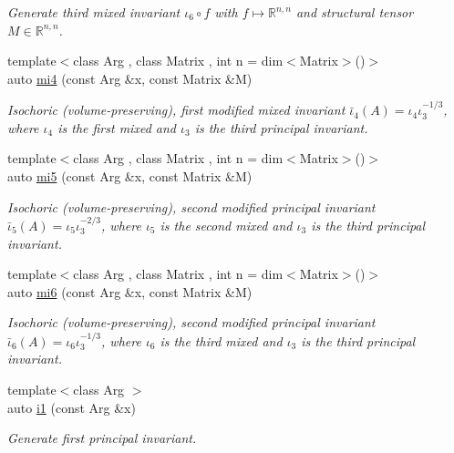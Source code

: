 \begin{DoxyCompactItemize}
\begin{DoxyCompactList}\small\item\em Generate third mixed invariant $ \iota_6\circ f $ with $f\mapsto\mathbb{R}^{n,n}$ and structural tensor $M\in\mathbb{R}^{n,n}$. \end{DoxyCompactList}\item 
{\footnotesize template$<$class Arg , class Matrix , int n = dim$<$\-Matrix$>$()$>$ }\\auto \hyperlink{group__InvariantGroup_ga7ee54c5d056877bdefefb8e54ad17791}{mi4} (const Arg \&x, const Matrix \&M)
\begin{DoxyCompactList}\small\item\em Isochoric (volume-\/preserving), first modified mixed invariant $ \bar\iota_4(A)=\iota_4\iota_3^{-1/3} $, where $\iota_4$ is the first mixed and $\iota_3$ is the third principal invariant. \end{DoxyCompactList}\item 
{\footnotesize template$<$class Arg , class Matrix , int n = dim$<$\-Matrix$>$()$>$ }\\auto \hyperlink{group__InvariantGroup_ga189bc682b34d13902da335c5eb502faa}{mi5} (const Arg \&x, const Matrix \&M)
\begin{DoxyCompactList}\small\item\em Isochoric (volume-\/preserving), second modified principal invariant $ \bar\iota_5(A)=\iota_5\iota_3^{-2/3} $, where $\iota_5$ is the second mixed and $\iota_3$ is the third principal invariant. \end{DoxyCompactList}\item 
{\footnotesize template$<$class Arg , class Matrix , int n = dim$<$\-Matrix$>$()$>$ }\\auto \hyperlink{group__InvariantGroup_ga3e451f9e15fa95080f81d0c0f69f93e6}{mi6} (const Arg \&x, const Matrix \&M)
\begin{DoxyCompactList}\small\item\em Isochoric (volume-\/preserving), second modified principal invariant $ \bar\iota_6(A)=\iota_6\iota_3^{-1/3} $, where $\iota_6$ is the third mixed and $\iota_3$ is the third principal invariant. \end{DoxyCompactList}\item 
{\footnotesize template$<$class Arg $>$ }\\auto \hyperlink{group__InvariantGroup_gafaead59b618d87239270f8eca2bf75c8}{i1} (const Arg \&x)
\begin{DoxyCompactList}\small\item\em Generate first principal invariant. \end{DoxyCompactList}\item 

\end{DoxyCompactItemize}
